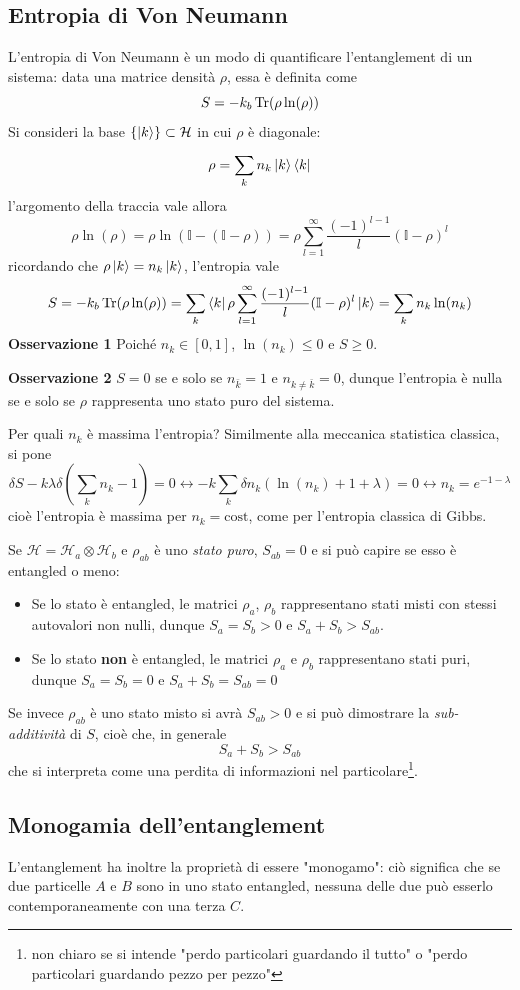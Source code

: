 \subsection{Entropia di Von Neumann}
L'entropia di Von Neumann è un modo di quantificare l'entanglement di un sistema:
data una matrice densità $\rho$, essa è definita come
$$S=-k_b\Tr(\rho\ln(\rho))$$
Si consideri la base $\left\{\ket{k}\right\}\subset\mathcal{H}$ in cui $\rho$ è diagonale:
$$\rho=\sum_{k}^{}n_k\ket{k}\bra{k}$$
l'argomento della traccia vale allora
$$\rho\ln(\rho)=\rho\ln(\mathbb{I}-(\mathbb{I}-\rho))=\rho\sum_{l=1}^{\infty}\frac{(-1)^{l-1}}{l}
(\mathbb{I}-\rho)^l$$
ricordando che $\rho\ket{k}=n_k\ket{k}$, l'entropia vale
$$S=-k_b\Tr(\rho\ln(\rho))=\sum_{k}^{}\bra{k}\rho\sum_{l=1}^{\infty}\frac{(-1)^{l-1}}{l}(\mathbb{I}
-\rho)^l\ket{k}=\sum_{k}^{}n_k\ln(n_k)$$
\textbf{Osservazione 1} Poiché $n_k\in[0,1]$, $\ln(n_k)\leq0$ e $S\geq0$.

\textbf{Osservazione 2} $S=0$ se e solo se $n_{\bar k}=1$ e $n_{k\not=\bar k}=0$, dunque l'entropia
è nulla se e solo se $\rho$ rappresenta uno stato puro del sistema.

Per quali $n_k$ è massima l'entropia? Similmente alla meccanica statistica classica, si pone
$$\delta S -k\lambda\delta \left(\sum_{k}^{}n_k-1\right)=0\leftrightarrow
-k\sum_{k}^{}\delta n_k\left(\ln(n_k)+1+\lambda\right)=0 \leftrightarrow n_k=e^{-1-\lambda}$$
cioè l'entropia è massima per $n_k=\text{cost}$, come per l'entropia classica di Gibbs.

Se $\mathcal{H}=\mathcal{H}_a\otimes\mathcal{H}_b$ e $\rho_{ab}$ è uno \textit{stato puro},
$S_{ab}=0$ e si può capire se esso è entangled o meno:
\begin{itemize}
    \item Se lo stato è entangled, le matrici $\rho_a$, $\rho_b$ rappresentano stati misti con
	stessi autovalori non nulli, dunque $S_a=S_b>0$ e $S_a+S_b>S_{ab}$.
    \item Se lo stato \textbf{non} è entangled, le matrici $\rho_a$ e $\rho_b$ rappresentano stati
	puri, dunque $S_a=S_b=0$ e $S_a+S_b=S_{ab}=0$
\end{itemize}
Se invece $\rho_{ab}$ è uno stato misto si avrà $S_{ab}>0$ e si può dimostrare la
\textit{sub-additività} di $S$, cioè che, in generale
$$S_a+S_b>S_{ab}$$
che si interpreta come una perdita di informazioni nel particolare\footnote{
non chiaro se si intende "perdo particolari guardando il tutto" o "perdo particolari guardando pezzo
per pezzo"
}.
\subsection{Monogamia dell'entanglement}
L'entanglement ha inoltre la proprietà di essere "monogamo": ciò significa che se due particelle $A$
e $B$ sono in uno stato entangled, nessuna delle due può esserlo contemporaneamente con una terza $C$.

